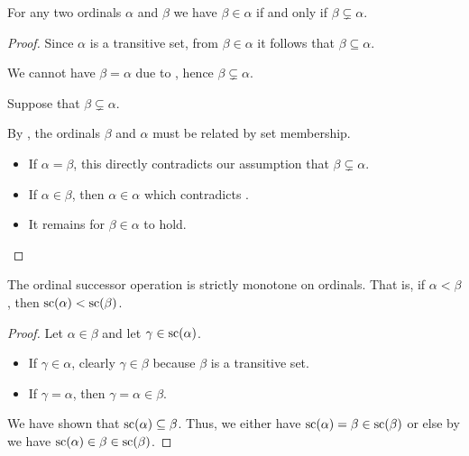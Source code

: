 \begin{proposition}\label{thm:ordinal_ordering_via_subsets}
  For any two ordinals \( \alpha \) and \( \beta \) we have \( \beta \in \alpha \) if and only if \( \beta \subsetneq \alpha \).
\end{proposition}
\begin{proof}
  \NecessitySubProof Since \( \alpha \) is a transitive set, from \( \beta \in \alpha \) it follows that \( \beta \subseteq \alpha \).

  We cannot have \( \beta = \alpha \) due to , hence \( \beta \subsetneq \alpha \).

  \SufficiencySubProof Suppose that \( \beta \subsetneq \alpha \).

  By , the ordinals \( \beta \) and \( \alpha \) must be related by set membership.
  \begin{itemize}
    \item If \( \alpha = \beta \), this directly contradicts our assumption that \( \beta \subsetneq \alpha \).
    \item If \( \alpha \in \beta \), then \( \alpha \in \alpha \) which contradicts .
    \item It remains for \( \beta \in \alpha \) to hold.
  \end{itemize}
\end{proof}

\begin{proposition}\label{thm:ordinal_successor_strictly_monotone_on_ordinals}
  The ordinal successor operation is strictly monotone on ordinals. That is, if \( \alpha < \beta \), then \( \op{sc}(\alpha) < \op{sc}(\beta) \).
\end{proposition}
\begin{proof}
  Let \( \alpha \in \beta \) and let \( \gamma \in \op{sc}(\alpha) \).
  \begin{itemize}
    \item If \( \gamma \in \alpha \), clearly \( \gamma \in \beta \) because \( \beta \) is a transitive set.

    \item If \( \gamma = \alpha \), then \( \gamma = \alpha \in \beta \).
  \end{itemize}

  We have shown that \( \op{sc}(\alpha) \subseteq \beta \). Thus, we either have \( \op{sc}(\alpha) = \beta \in \op{sc}(\beta) \) or else by  we have \( \op{sc}(\alpha) \in \beta \in \op{sc}(\beta) \).
\end{proof}


